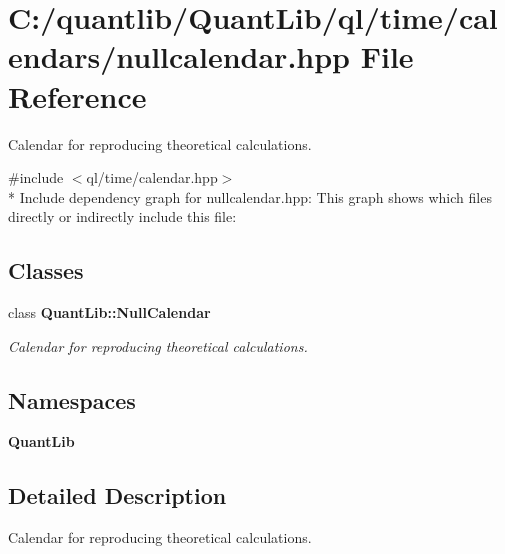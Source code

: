 \section{C\+:/quantlib/\+Quant\+Lib/ql/time/calendars/nullcalendar.hpp File Reference}
\label{nullcalendar_8hpp}


Calendar for reproducing theoretical calculations.  


{\ttfamily \#include $<$ql/time/calendar.\+hpp$>$}\\*
Include dependency graph for nullcalendar.\+hpp\+:
This graph shows which files directly or indirectly include this file\+:
\subsection*{Classes}
\begin{DoxyCompactItemize}
\item 
class {\bf Quant\+Lib\+::\+Null\+Calendar}
\begin{DoxyCompactList}\small\item\em Calendar for reproducing theoretical calculations. \end{DoxyCompactList}\end{DoxyCompactItemize}
\subsection*{Namespaces}
\begin{DoxyCompactItemize}
\item 
 {\bf Quant\+Lib}
\end{DoxyCompactItemize}


\subsection{Detailed Description}
Calendar for reproducing theoretical calculations. 

